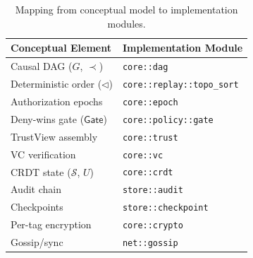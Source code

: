 \documentclass[10pt,journal,compsoc]{IEEEtran}
\begin{document}
\begin{table}[!htbp]
\centering
\caption{Mapping from conceptual model to implementation modules.}
\label{tab:impl-mapping}
\begin{tabular}{@{}ll@{}}
\toprule
\textbf{Conceptual Element} & \textbf{Implementation Module} \\
\midrule
Causal DAG ($G$, $\prec$) & \texttt{core::dag} \\
Deterministic order ($\triangleleft$) & \texttt{core::replay::topo\_sort} \\
Authorization epochs & \texttt{core::epoch} \\
Deny-wins gate ($\mathsf{Gate}$) & \texttt{core::policy::gate} \\
TrustView assembly & \texttt{core::trust} \\
VC verification & \texttt{core::vc} \\
CRDT state ($\mathcal{S}$, $U$) & \texttt{core::crdt} \\
Audit chain & \texttt{store::audit} \\
Checkpoints & \texttt{store::checkpoint} \\
Per-tag encryption & \texttt{core::crypto} \\
Gossip/sync & \texttt{net::gossip} \\
\bottomrule
\end{tabular}
\end{table}
\end{document}
